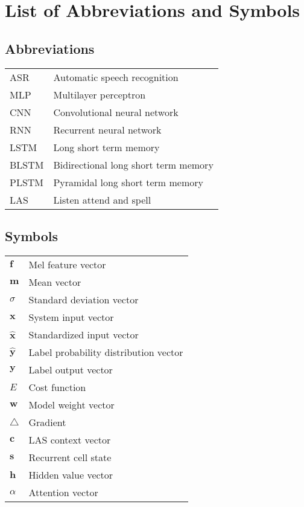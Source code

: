 \documentclass[master=ewit,english]{kulemt}
\begin{document}
\listoffiguresandtables
\chapter{List of Abbreviations and Symbols}
\section*{Abbreviations}
\begin{flushleft}
  \renewcommand{\arraystretch}{1.1}
  \begin{tabularx}{\textwidth}{@{}p{12mm}X@{}}
    ASR   & Automatic speech recognition \\
    MLP	  & Multilayer perceptron \\
    CNN   & Convolutional neural network \\
    RNN   & Recurrent neural network \\
    LSTM  & Long short term memory \\
    BLSTM & Bidirectional long short term memory \\
    PLSTM & Pyramidal long short term memory \\
    LAS	  & Listen attend and spell
  \end{tabularx}
\end{flushleft}
\section*{Symbols}
\begin{flushleft}
  \renewcommand{\arraystretch}{1.1}
  \begin{tabularx}{\textwidth}{@{}p{12mm}X@{}}
	$\mathbf{f}$ & Mel feature vector \\
	$\mathbf{m}$ & Mean vector \\
	$\sigma$	 & Standard deviation vector \\
	$\mathbf{x}$ & System input vector \\
	$\hat{\mathbf{x}}$ & Standardized input vector \\
	$\hat{\mathbf{y}}$ & Label probability distribution vector \\
	$\mathbf{y}$ & Label output vector \\
	$E$			 & Cost function \\
	$\mathbf{w}$ & Model weight vector \\
	$\triangle$	 & Gradient \\
	$\mathbf{c}$  & LAS context vector \\
	$\mathbf{s}$  & Recurrent cell state \\
	$\mathbf{h}$  & Hidden value vector \\
	$\alpha$	 & Attention vector \\
	
  \end{tabularx}
\end{flushleft}
\end{document}
